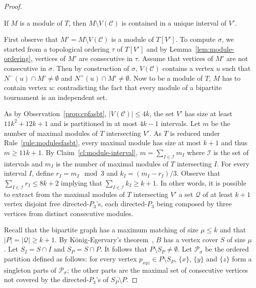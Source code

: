 \begin{proof}
\begin{claim} \label{cl:module-interval}
If $M$ is a module of $T$, then $M\setminus V(\mathcal{C})$ is contained in a unique interval of $V'$.
\end{claim}
\begin{proofclaim}
First observe that $M'=M\setminus V(\mathcal{C})$ is a module of $T[V']$. To compute $\sigma$, we started from a topological ordering $\tau$ of $T[V']$ and by Lemma~\ref{lem:module-ordering}, vertices of $M'$ are consecutive in $\tau$.
Assume that vertices of $M'$ are not consecutive in $\sigma$. Then by construction of $\sigma$, $V(\mathcal{C})$ contains a vertex $u$ such that $N^-(u)\cap M'\neq\emptyset$ and $N^+(u)\cap M'\neq\emptyset$. Now to be a module of $T$, $M$ has to contain vertex $u$: contradicting the fact that every module of a bipartite tournament is an independent set.
\end{proofclaim}

As by Observation~\ref{prop:cpfasbt}, $|V(\mathcal{C})|\leqslant 4k$, the set $V'$ has size at least $11k^2+12k+1$ and is partitioned in at most $4k-1$ intervals. Let $m$ be the number of maximal modules of $T$ intersecting $V'$. As $T$ is reduced under Rule~\ref{rule:modulesfasbt}, every maximal module has size at most $k+1$ and thus $m\geqslant 11k+1$. By Claim~\ref{cl:module-interval}, $m=\sum_{I\in\mathcal{I}} m_I$ where $\mathcal{I}$ is the set of intervals and $m_I$ is the number of maximal modules of $T$ intersecting $I$. For every interval $I$, define $r_I=m_I\mod 3$ and $k_I=(m_I-r_I)/3$. Observe that $\sum_{I\in\mathcal{I}} r_I\leqslant 8k+2$ implying that $\sum_{I\in\mathcal{I}} k_I\geqslant k+1$. In other words, it is possible to extract from the maximal modules of $T$ intersecting $V'$ a set $\mathcal{Q}$ of at least $k+1$ vertex disjoint free directed-$P_3$'s, each directed-$P_3$ being composed by three vertices from distinct consecutive modules.

Recall that the bipartite graph has a maximum matching of size $\mu\leqslant k$ and that $|P|=|\mathcal{Q}|\geqslant k+1$. By K\"onig-Egervary's theorem~\cite{BM76}, $B$ has a vertex cover $S$ of size $\mu$. Let $S_I=S\cap I$ and $S_P=S\cap P$. It follows that $P\setminus S_P\neq\emptyset$. Let $\mathcal{P}_\sigma$ be the ordered partition defined as follows: for every vertex $p_{xyz}\in  P\setminus S_P$, $\{x\}$, $\{y\}$ and $\{z\}$ form a singleton parts of $\mathcal{P}_\sigma$; the other parts are the maximal set of consecutive vertices not covered by the directed-$P_3$'s of $S_P\setminus P$. 


\end{proof}
